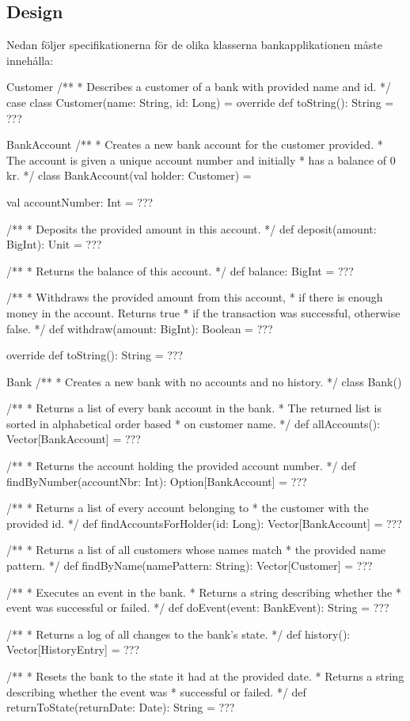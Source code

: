 \subsection{Design}
Nedan följer specifikationerna för de olika klasserna bankapplikationen måste innehålla:

\begin{ScalaSpec}{Customer}
/**
 * Describes a customer of a bank with provided name and id.
 */
case class Customer(name: String, id: Long) = {
	override def toString(): String = ???
}
\end{ScalaSpec}


\begin{ScalaSpec}{BankAccount}
/**
 * Creates a new bank account for the customer provided.
 * The account is given a unique account number and initially
 * has a balance of 0 kr.
 */
class BankAccount(val holder: Customer) = {
  val accountNumber: Int = ???

  /**
   * Deposits the provided amount in this account.
   */
  def deposit(amount: BigInt): Unit = ???

  /**
   * Returns the balance of this account.
   */
  def balance: BigInt = ???

  /**
   * Withdraws the provided amount from this account,
   * if there is enough money in the account. Returns true
   * if the transaction was successful, otherwise false.
   */
  def withdraw(amount: BigInt): Boolean = ???

  override def toString(): String = ???
}
\end{ScalaSpec}


\begin{ScalaSpec}{Bank}
/**
 * Creates a new bank with no accounts and no history.
 */
class Bank() {
 /**
   * Returns a list of every bank account in the bank.
   * The returned list is sorted in alphabetical order based
   * on customer name.
   */
  def allAccounts(): Vector[BankAccount] = ???

  /**
   * Returns the account holding the provided account number.
   */
  def findByNumber(accountNbr: Int): Option[BankAccount] = ???

  /**
   * Returns a list of every account belonging to
   * the customer with the provided id.
   */
  def findAccountsForHolder(id: Long): Vector[BankAccount] = ???

  /**
   * Returns a list of all customers whose names match
   * the provided name pattern.
   */
  def findByName(namePattern: String): Vector[Customer] = ???

  /**
   * Executes an event in the bank.
   * Returns a string describing whether the
   * event was successful or failed.
   */
  def doEvent(event: BankEvent): String = ???

  /**
   * Returns a log of all changes to the bank's state.
   */
  def history(): Vector[HistoryEntry] = ???

  /**
   * Resets the bank to the state it had at the provided date.
   * Returns a string describing whether the event was
   * successful or failed.
   */
  def returnToState(returnDate: Date): String = ???
}
\end{ScalaSpec}


